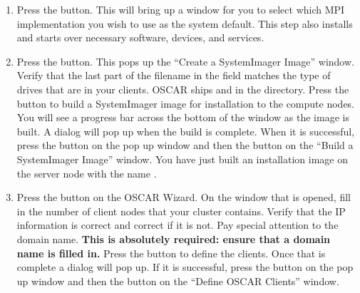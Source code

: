 \begin {enumerate}
\begin{verbatim}
  # ./install_cluster <device>
\end{verbatim}
  
  In the above command, substitute the device name (e.g., \emph{eth1})
  in place of  for your server's private network
  ethernet adapter.  After  successfully
  completes some initial setup, it will display the OSCAR wizard GUI.


\item Press the  button.
  This will bring up a window for you to select which MPI
  implementation you wish to use as the system default.  This step
  also installs and starts over necessary software, devices, and
  services.


\item Press the  button.  This pops
  up the ``Create a SystemImager Image'' window. Verify that the last
  part of the filename in the  field
  matches the type of drives that are in your clients. OSCAR ships
   and  in the
   directory.  Press the  button
  to build a SystemImager image for installation to the compute nodes.
  You will see a progress bar across the bottom of the window as the
  image is built.  A dialog will pop up when the build is complete.
  When it is successful, press the  button on the pop up
  window and then the  button on the ``Build a
  SystemImager Image'' window. You have just built an installation
  image on the server node with the name .

  
\item Press the  button on the OSCAR
  Wizard.  On the window that is opened, fill in the number of client
  nodes that your cluster contains. Verify that the IP information is
  correct and correct if it is not.  Pay special attention to the
  domain name. {\bf This is absolutely required: ensure that a domain
    name is filled in.}  Press the  button to define
  the clients. Once that is complete a dialog will pop up.  If it is
  successful, press the  button on the pop up window and
  then the  button on the ``Define OSCAR Clients''
  window.


\end{enumerate}
